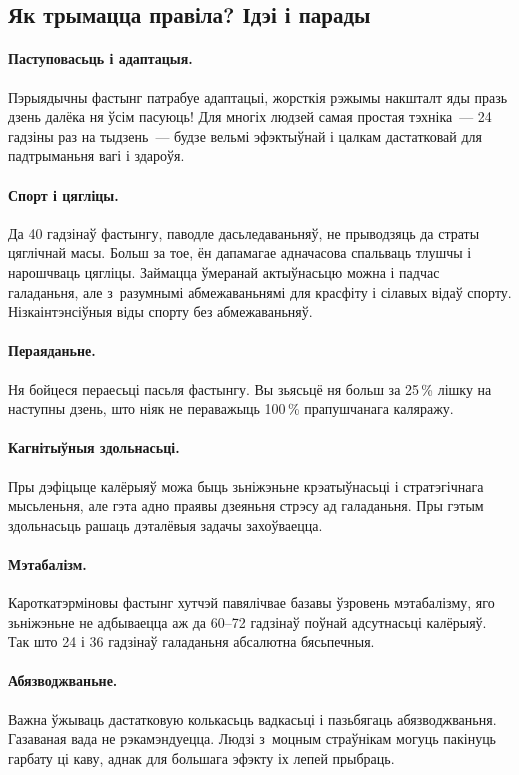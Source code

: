 \subsection{Як трымацца правіла? Ідэі і парады}

\paragraph{Паступовасьць і адаптацыя.}
Пэрыядычны фастынг патрабуе адаптацыі, жорсткія рэжымы накшталт яды празь дзень далёка ня ўсім пасуюць! Для многіх людзей самая простая тэхніка~--- 24 гадзіны раз на тыдзень~--- будзе вельмі эфэктыўнай і цалкам дастатковай для падтрыманьня вагі і здароўя.

\paragraph{Спорт і цягліцы.}
Да 40 гадзінаў фастынгу, паводле дасьледаваньняў, не прыводзяць да страты цяглічнай масы. Больш за тое, ён дапамагае адначасова спальваць тлушчы і нарошчваць цягліцы. Займацца ўмеранай актыўнасьцю можна і падчас галаданьня, але з~разумнымі абмежаваньнямі для красфіту і сілавых відаў спорту. Нізкаінтэнсіўныя віды спорту без абмежаваньняў.

\paragraph{Пераяданьне.}
Ня бойцеся пераесьці пасьля фастынгу. Вы зьясьцё ня больш за 25\,\% лішку на наступны дзень, што ніяк не пераважыць 100\,\% прапушчанага каляражу.

\paragraph{Кагнітыўныя здольнасьці.}
Пры дэфіцыце калёрыяў можа быць зьніжэньне крэатыўнасьці і стратэгічнага мысьленьня, але гэта адно праявы дзеяньня стрэсу ад галаданьня. Пры гэтым здольнасьць рашаць дэталёвыя задачы захоўваецца.

\paragraph{Мэтабалізм.}
Кароткатэрміновы фастынг хутчэй павялічвае базавы ўзровень мэтабалізму, яго зьніжэньне не адбываецца аж да 60--72 гадзінаў поўнай адсутнасьці калёрыяў. Так што 24 і 36 гадзінаў галаданьня абсалютна бясьпечныя.

\paragraph{Абязводжваньне.}
Важна ўжываць дастатковую колькасьць вадкасьці і пазьбягаць абязводжваньня. Газаваная вада не рэкамэндуецца. Людзі з~моцным страўнікам могуць пакінуць гарбату ці каву, аднак для большага эфэкту іх лепей прыбраць.

